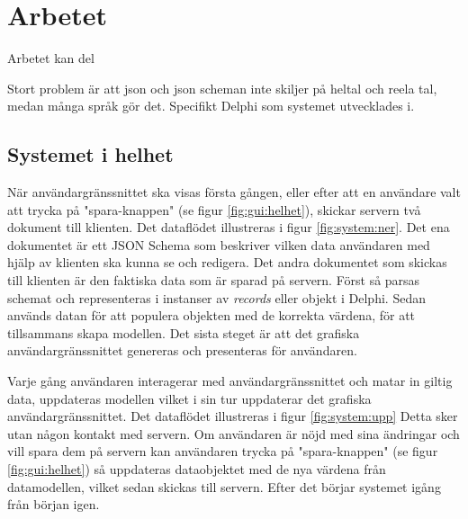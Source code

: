 \chapter{Arbetet}
\label{sec:arbetet}
Arbetet kan del


Stort problem är att json och json scheman inte skiljer på heltal och reela tal, medan många språk gör det. Specifikt Delphi som systemet utvecklades i.

\section{Systemet i helhet}

När användargränssnittet ska visas första gången, eller efter att en användare valt att trycka på "spara-knappen" (se figur \ref{fig:gui:helhet}), skickar servern två dokument till klienten. Det dataflödet illustreras i figur \ref{fig:system:ner}. Det ena dokumentet är ett JSON Schema som beskriver vilken data användaren med hjälp av klienten ska kunna se och redigera. Det andra dokumentet som skickas till klienten är den faktiska data som är sparad på servern. Först så parsas schemat och representeras i instanser av \textit{records} eller objekt i Delphi. Sedan används datan för att populera objekten med de korrekta värdena, för att tillsammans skapa modellen. Det sista steget är att det grafiska användargränssnittet genereras och presenteras för användaren.

Varje gång användaren interagerar med användargränssnittet och matar in giltig data, uppdateras modellen vilket i sin tur uppdaterar det grafiska användargränssnittet. Det dataflödet illustreras i figur \ref{fig:system:upp} Detta sker utan någon kontakt med servern. Om användaren är nöjd med sina ändringar och vill spara dem på servern kan användaren trycka på "spara-knappen" (se figur \ref{fig:gui:helhet}) så uppdateras dataobjektet med de nya värdena från datamodellen, vilket sedan skickas till servern. Efter det börjar systemet igång från början igen.

